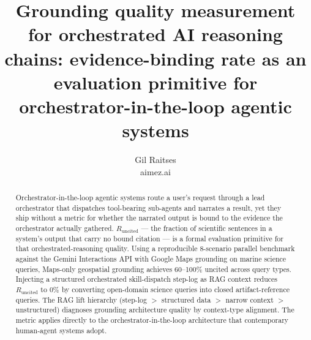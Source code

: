 \documentclass[10pt,twocolumn]{article}
\title{Grounding quality measurement for orchestrated AI reasoning chains:
       evidence-binding rate as an evaluation primitive for orchestrator-in-the-loop agentic systems}
\author{Gil Raitses \\ \small aimez.ai}
\date{}
\newcommand{\Runcited}{R_{\mathrm{uncited}}}
\begin{document}
\maketitle

\fontsize{8.45}{9.25}\selectfont

\begin{abstract}
Orchestrator-in-the-loop agentic systems route a user's request through a lead orchestrator that
dispatches tool-bearing sub-agents and narrates a result, yet they ship without a metric for
whether the narrated output is bound to the evidence the orchestrator actually gathered.
$\Runcited$ --- the fraction of scientific sentences in a system's output that carry no bound
citation --- is a formal evaluation primitive for that orchestrated-reasoning quality. Using a
reproducible 8-scenario parallel benchmark against the Gemini Interactions API with Google Maps
grounding on marine science queries, Maps-only geospatial grounding achieves 60--100\% uncited
across query types. Injecting a structured orchestrated skill-dispatch step-log as RAG context reduces $\Runcited$ to 0\% by converting open-domain science queries into closed artifact-reference queries. The RAG lift
hierarchy (step-log $>$ structured data $>$ narrow context $>$ unstructured) diagnoses grounding
architecture quality by context-type alignment. The metric
applies directly to the orchestrator-in-the-loop architecture that contemporary human-agent
systems adopt.
\end{abstract}








\clearpage
\printbibliography[title={References}]

\end{document}
